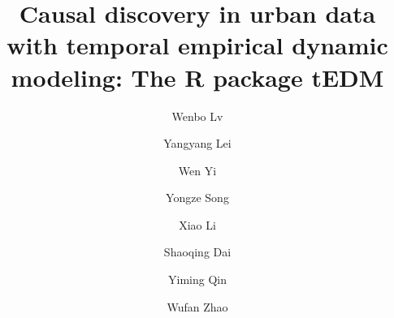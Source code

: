 \documentclass[authoryear,preprint,review,12pt]{elsarticle}
\begin{document}
\begin{frontmatter}
\title{Causal discovery in urban data with temporal empirical dynamic modeling: The R package tEDM}

\author[a,b,c]{Wenbo Lv}

\author[d]{Yangyang Lei}

\author[b]{Wen Yi}

\author[e]{Yongze Song}

\author[f,g]{Xiao Li}

\author[h]{Shaoqing Dai}

\author[i]{Yiming Qin}

\author[a]{Wufan Zhao}

\address[a]{Urban Governance and Design Thrust, Society Hub, The Hong Kong University of Science and Technology(Guangzhou), Guangzhou, China}
\address[b]{Department of Building and Real Estate, The Hong Kong Polytechnic University, Hong Kong SAR, China}
\address[c]{The Hong Kong Polytechnic University, Shenzhen Research Institute, Shenzhen, China}
\address[d]{School of Architecture and Design, Harbin Institute of Technology, Harbin, China}
\address[e]{School of Design and the Built Environment, Curtin University, Perth, Australia}
\address[f]{Department of Land Surveying and Geo-Informatics, The Hong Kong Polytechnic University, Hong Kong SAR, China}
\address[g]{Transport Studies Unit, School of Geography and the Environment, University of Oxford, UK}
\address[h]{School of Resource and Environmental Sciences, Wuhan University, Wuhan, China}
\address[i]{School of the Environment and Sustainable Engineering, Eastern Institute of Technology, Ningbo, China}


\end{frontmatter}
\end{document}
